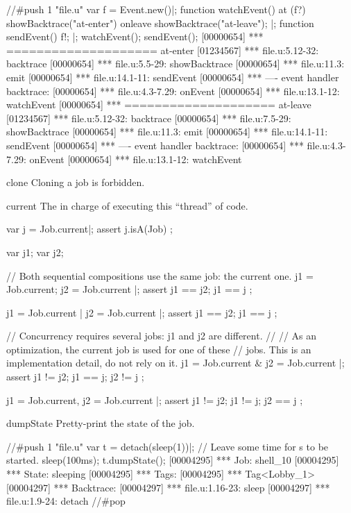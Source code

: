 \begin{urbiscriptapi}
\begin{urbiscript}
//#push 1 "file.u"
var f = Event.new()|;
function watchEvent()
{
  at (f?)
    showBacktrace("at-enter")
  onleave
    showBacktrace("at-leave");
}|;
function sendEvent()
{
  f!;
}|;
watchEvent();
sendEvent();
[00000654] *** ==================== at-enter
[01234567] *** file.u:5.12-32: backtrace
[00000654] *** file.u:5.5-29: showBacktrace
[00000654] *** file.u:11.3: emit
[00000654] *** file.u:14.1-11: sendEvent
[00000654] *** ---- event handler backtrace:
[00000654] *** file.u:4.3-7.29: onEvent
[00000654] *** file.u:13.1-12: watchEvent
[00000654] *** ==================== at-leave
[01234567] *** file.u:5.12-32: backtrace
[00000654] *** file.u:7.5-29: showBacktrace
[00000654] *** file.u:11.3: emit
[00000654] *** file.u:14.1-11: sendEvent
[00000654] *** ---- event handler backtrace:
[00000654] *** file.u:4.3-7.29: onEvent
[00000654] *** file.u:13.1-12: watchEvent
\end{urbiscript}


\item[clone]
  Cloning a job is forbidden.


\item[current]%
  The  in charge of executing this ``thread'' of code.
\begin{urbiscript}
var j = Job.current|;
assert { j.isA(Job) };

var j1; var j2;

// Both sequential compositions use the same job: the current one.
{ j1 = Job.current; j2 = Job.current }|;
assert { j1 == j2; j1 == j };

{ j1 = Job.current | j2 = Job.current }|;
assert { j1 == j2; j1 == j };

// Concurrency requires several jobs: j1 and j2 are different.
//
// As an optimization, the current job is used for one of these
// jobs.  This is an implementation detail, do not rely on it.
{ j1 = Job.current & j2 = Job.current }|;
assert { j1 != j2; j1 == j; j2 != j };

{ j1 = Job.current, j2 = Job.current }|;
assert { j1 != j2; j1 != j; j2 == j };
\end{urbiscript}


\item[dumpState]
  Pretty-print the state of the job.

\begin{urbiscript}
//#push 1 "file.u"
var t = detach(sleep(1))|;
// Leave some time for s to be started.
sleep(100ms);
t.dumpState();
[00004295] *** Job: shell_10
[00004295] ***   State: sleeping
[00004295] ***   Tags:
[00004295] ***     Tag<Lobby_1>
[00004297] ***   Backtrace:
[00004297] ***     file.u:1.16-23: sleep
[00004297] ***     file.u:1.9-24: detach
//#pop
\end{urbiscript}



\end{urbiscriptapi}
